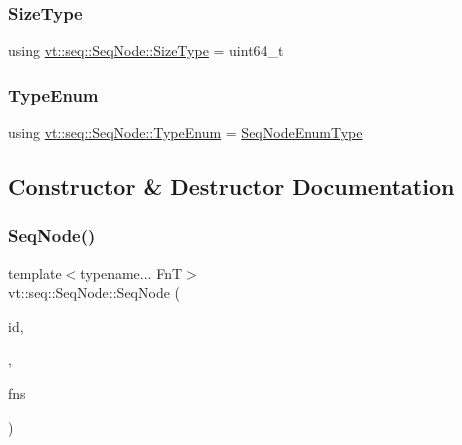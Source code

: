 \subsubsection{\texorpdfstring{Size\+Type}{SizeType}}
{\footnotesize\ttfamily using \hyperlink{structvt_1_1seq_1_1_seq_node_af2b8ae88c3519f2a6142915ddc974c9d}{vt\+::seq\+::\+Seq\+Node\+::\+Size\+Type} =  uint64\+\_\+t}

\mbox{\label{structvt_1_1seq_1_1_seq_node_ac24353353c002acd8c5d6aa533533216}} 
\subsubsection{\texorpdfstring{Type\+Enum}{TypeEnum}}
{\footnotesize\ttfamily using \hyperlink{namespacevt_1_1seq_ae721d4e8b95cf57a7e4169db1929e0f1}{vt\+::seq\+::\+Seq\+Node\+::\+Type\+Enum} =  \hyperlink{namespacevt_1_1seq_ae721d4e8b95cf57a7e4169db1929e0f1}{Seq\+Node\+Enum\+Type}}



\subsection{Constructor \& Destructor Documentation}
\mbox{\label{structvt_1_1seq_1_1_seq_node_acd2c0bf2255d6ebbcc5bc586e333a999}} 
\subsubsection{\texorpdfstring{Seq\+Node()}{SeqNode()}\hspace{0.1cm}{\footnotesize\ttfamily [1/6]}}
{\footnotesize\ttfamily template$<$typename... FnT$>$ \\
vt\+::seq\+::\+Seq\+Node\+::\+Seq\+Node (\begin{DoxyParamCaption}\item[{\hyperlink{namespacevt_1_1seq_a3b612da217ac669d39c159f134ab8434}{Seq\+Type} const \&}]{id,  }\item[{Seq\+Node\+Leaf\+Tag}]{,  }\item[{FnT \&\&...}]{fns }\end{DoxyParamCaption})}

